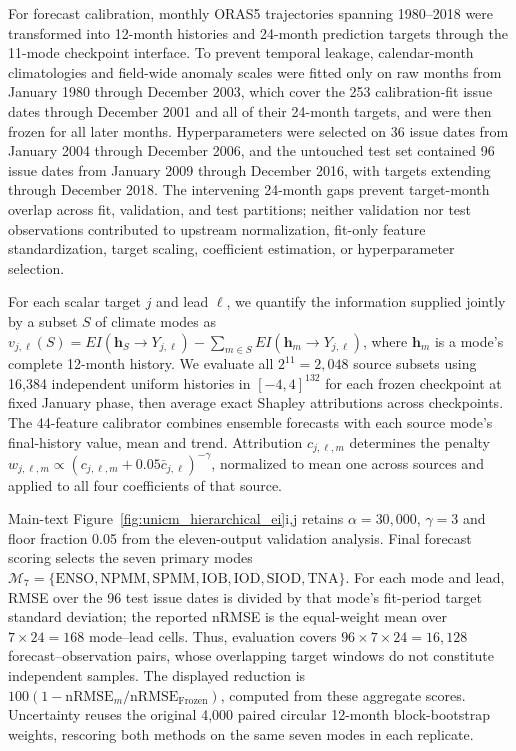\documentclass[fleqn,10pt]{wlscirep}
\begin{document}
For forecast calibration, monthly ORAS5 trajectories spanning 1980--2018 were transformed into 12-month histories and 24-month prediction targets through the 11-mode checkpoint interface. To prevent temporal leakage, calendar-month climatologies and field-wide anomaly scales were fitted only on raw months from January 1980 through December 2003, which cover the 253 calibration-fit issue dates through December 2001 and all of their 24-month targets, and were then frozen for all later months. Hyperparameters were selected on 36 issue dates from January 2004 through December 2006, and the untouched test set contained 96 issue dates from January 2009 through December 2016, with targets extending through December 2018. The intervening 24-month gaps prevent target-month overlap across fit, validation, and test partitions; neither validation nor test observations contributed to upstream normalization, fit-only feature standardization, target scaling, coefficient estimation, or hyperparameter selection.

For each scalar target $j$ and lead $\ell$, we quantify the information supplied jointly by a subset $S$ of climate modes as $v_{j,\ell}(S)=EI(\mathbf{h}_S\!\rightarrow Y_{j,\ell})-\sum_{m\in S}EI(\mathbf{h}_m\!\rightarrow Y_{j,\ell})$, where $\mathbf{h}_m$ is a mode's complete 12-month history. We evaluate all $2^{11}=2{,}048$ source subsets using 16,384 independent uniform histories in $[-4,4]^{132}$ for each frozen checkpoint at fixed January phase, then average exact Shapley attributions across checkpoints. The 44-feature calibrator combines ensemble forecasts with each source mode's final-history value, mean and trend. Attribution $c_{j,\ell,m}$ determines the penalty $w_{j,\ell,m}\propto(c_{j,\ell,m}+0.05\bar c_{j,\ell})^{-\gamma}$, normalized to mean one across sources and applied to all four coefficients of that source.

Main-text Figure~\ref{fig:unicm_hierarchical_ei}i,j retains $\alpha=30{,}000$, $\gamma=3$ and floor fraction 0.05 from the eleven-output validation analysis. Final forecast scoring selects the seven primary modes $\mathcal{M}_7=\{\mathrm{ENSO,NPMM,SPMM,IOB,IOD,SIOD,TNA}\}$. For each mode and lead, RMSE over the 96 test issue dates is divided by that mode's fit-period target standard deviation; the reported nRMSE is the equal-weight mean over $7\times24=168$ mode--lead cells. Thus, evaluation covers $96\times7\times24=16{,}128$ forecast--observation pairs, whose overlapping target windows do not constitute independent samples. The displayed reduction is $100(1-\mathrm{nRMSE}_m/\mathrm{nRMSE}_{\mathrm{Frozen}})$, computed from these aggregate scores. Uncertainty reuses the original 4,000 paired circular 12-month block-bootstrap weights, rescoring both methods on the same seven modes in each replicate.
\end{document}
